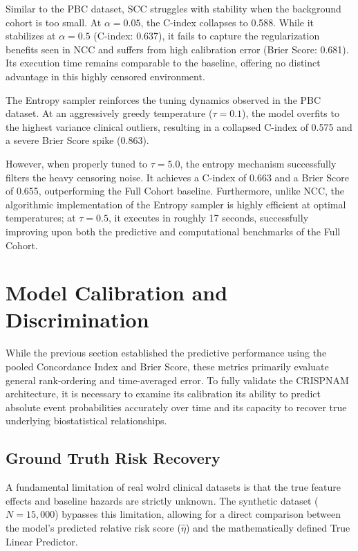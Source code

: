 \documentclass[a4paper,twoside,12pt]{report}
\begin{document}
Similar to the PBC dataset, SCC struggles with stability when the background cohort is too small. At $\alpha=0.05$, the C-index collapses to 0.588. While it stabilizes at $\alpha=0.5$ (C-index: 0.637), it fails to capture the regularization benefits seen in NCC and suffers from high calibration error (Brier Score: 0.681). Its execution time remains comparable to the baseline, offering no distinct advantage in this highly censored environment.


The Entropy sampler reinforces the tuning dynamics observed in the PBC dataset. At an aggressively greedy temperature ($\tau=0.1$), the model overfits to the highest variance clinical outliers, resulting in a collapsed C-index of 0.575 and a severe Brier Score spike (0.863). 

However, when properly tuned to $\tau=5.0$, the entropy mechanism successfully filters the heavy censoring noise. It achieves a C-index of 0.663 and a Brier Score of 0.655, outperforming the Full Cohort baseline. Furthermore, unlike NCC, the algorithmic implementation of the Entropy sampler is highly efficient at optimal temperatures; at $\tau=0.5$, it executes in roughly 17 seconds, successfully improving upon both the predictive and computational benchmarks of the Full Cohort.


\section{Model Calibration and Discrimination}

While the previous section established the predictive performance using the pooled Concordance Index and Brier Score, these metrics primarily evaluate general rank-ordering and time-averaged error. To fully validate the CRISPNAM architecture, it is necessary to examine its calibration its ability to predict absolute event probabilities accurately over time and its capacity to recover true underlying biostatistical relationships.

\subsection{Ground Truth Risk Recovery}

A fundamental limitation of real wolrd clinical datasets is that the true feature effects and baseline hazards are strictly unknown. The synthetic dataset ($N=15,000$) bypasses this limitation, allowing for a direct comparison between the model's predicted relative risk score ($\hat{\eta}$) and the mathematically defined True Linear Predictor.
\end{document}
